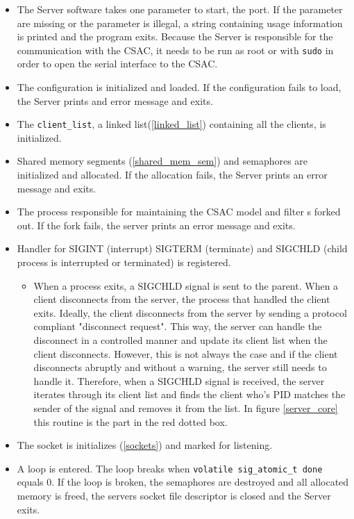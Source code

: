 \documentclass[12pt,english,a4paper]{report}
\begin{document}
\begin{itemize} %
  \item The Server software takes one parameter to start, the port. If the parameter are missing or the parameter is illegal, a string containing usage information is printed and the program exits. Because the Server is responsible for the communication with the CSAC, it needs to be run as root or with \texttt{sudo} in order to open the serial interface to the CSAC.
  \item The configuration is initialized and loaded. If the configuration fails to load, the Server prints and error message and exits.
  \item The \texttt{client\_list}, a linked list(\ref{linked_list}) containing all the clients, is initialized.
  \item Shared memory segments (\ref{shared_mem_sem}) and semaphores are initialized and allocated. If the allocation fails, the Server prints an error message and exits.
  \item The process responsible for maintaining the CSAC model and filter s forked out. If the fork fails, the server prints an error message and exits.
  \item Handler for SIGINT (interrupt) SIGTERM (terminate) and SIGCHLD (child process is interrupted or terminated) is registered.
  \begin{itemize}
      \item When a process exits, a SIGCHLD signal is sent to the parent. When a client disconnects from the server, the process that handled the client exits. Ideally, the client disconnects from the server by sending a protocol compliant "disconnect request". This way, the server can handle the disconnect in a controlled manner and update its client list when the client disconnects. However, this is not always the case and if the client disconnects abruptly and without a warning, the server still needs to handle it. Therefore, when a SIGCHLD signal is received, the server iterates through its client list and finds the client who's PID matches the sender of the signal and removes it from the list. In figure \ref{server_core} this routine is the part in the red dotted box. 
  \end{itemize}
  \item The socket is initializes (\ref{sockets}) and marked for listening.
  \item A loop is entered. The loop breaks when \texttt{volatile sig\_atomic\_t done} equals 0. If the loop is broken, the semaphores are destroyed and all allocated memory is freed, the servers socket file descriptor is closed and the Server exits.

\end{itemize}
\end{document}
